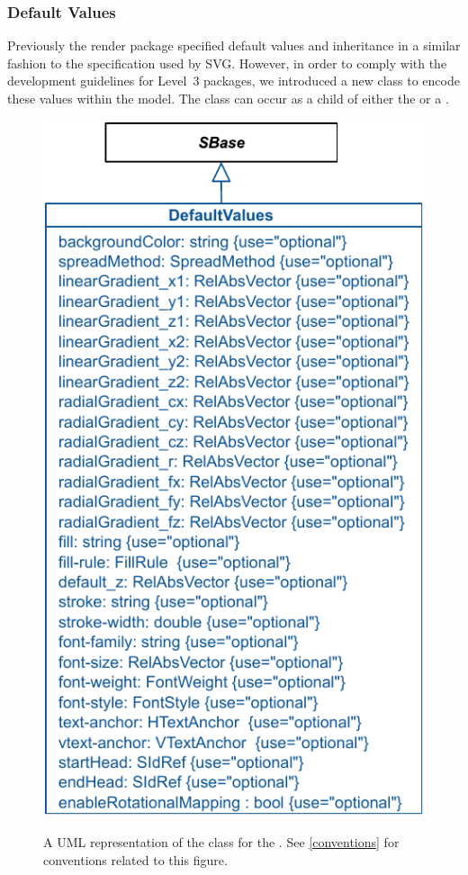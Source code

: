 \subsubsection{Default Values}
\label{defaultvalues-class}
Previously the render package specified default values and inheritance in a similar fashion to the specification used by SVG. However, in order to comply with the \SBML 
development guidelines for Level~3 packages, we introduced a new class \DefaultValues to encode these values within the model. 
The \DefaultValues class can occur as a child of either the \ListOfGlobalRenderInformation or a 
\ListOfLocalRenderInformation. 

\begin{figure}[!ht]
  \centering
  \includegraphics{images/render-default-values}\\
  \caption{A UML representation of the \DefaultValues class for the \RenderPackage.  See \ref{conventions} for conventions related to this figure. }
  \label{fig:default-values}
\end{figure}

